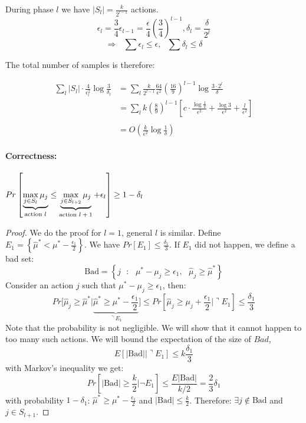 During phase $l$ we have $\left|S_{l}\right|=\frac{k}{2^{l-1}}$
actions.
\[
\epsilon_{l}=\frac{3}{4}\epsilon_{l-1}=\frac{\epsilon}{4}\left(\frac{3}{4}\right)^{l-1},\text{
}\delta_{l}=\frac{\delta}{2^{l}}
\]
\[
\Rightarrow\text{ }{\displaystyle \sum\epsilon_{l}\le\epsilon},\text{ }{\displaystyle \sum\delta_{l}\le\delta}
\]

The total number of samples is therefore:

\begin{align*}
 \sum_l |S_l| \cdot \frac{4}{\epsilon_l^2}\log \frac{3}{\delta_l} &=
\sum_{l}\frac{k}{2^{l-1}}\frac{64}{\epsilon^{2}}\left(\frac{16}{9}\right)^{l-1}\log\frac{3\cdot2^{l}}{\delta}\\
& =  {\displaystyle \sum_{l}k\left(\frac{8}{9}\right)^{l-1}\left[c\cdot\frac{\log\frac{1}{\delta}}{\epsilon^{2}}+\frac{\log3}{\epsilon^{2}}+\frac{l}{\epsilon^{2}}\right]}\\
\\
 & =  O\left(\frac{k}{\epsilon^{2}}\log\frac{1}{\delta}\right)
\end{align*}


\paragraph{Correctness:}

\begin{theorem}
$Pr\left[\underbrace{{\displaystyle \max_{j\in
S_{l}}\mu_{j}}}_{\text{action
\ensuremath{l}}}\le\underbrace{{\displaystyle \max_{j\in
S_{l+2}}\mu_{j}}}_{\text{action
\ensuremath{l+1}}}+\epsilon_{l}\right]\ge1-\delta_{l}$
\end{theorem}

\begin{proof}
We do the proof for $l=1$, general $l$ is similar. Define
$E_{1}=\left\{\hat{\mu}^{*}<\mu^{*}-\frac{\epsilon_{1}}{2}\right\}$.
We have  $Pr\left[E_{1}\right]\le\frac{\delta_{1}}{3}$. If $E_{1}$
did not happen, we define a bad set:
\[
\text{Bad}=\left\{ j\text{ }:\text{ }\mu^{*}-\mu_{j}\ge\epsilon_{1},\text{ }\hat{\mu}_{j}\ge\hat{\mu}^{*}\right\}
\]
Consider an action $j$ such that $\mu^*-\mu_j\geq \epsilon_1$, then:
\[
Pr[\hat{\mu}_{j}\geq
\hat{\mu}^{*}|\underbrace{\hat{\mu}^{*}\ge\mu^{*}-\frac{\epsilon_{1}}{2}}_{\urcorner
E_{1}}\big] \le
Pr[\hat{\mu}_{j}\ge\mu_{j}+\frac{\epsilon_{1}}{2}|\urcorner E_{1}]
\le  \frac{\delta_{1}}{3}
\]
Note that the probability is not negligible. We will show that it
cannot happen to too many such actions. We will bound the
expectation of the size of $Bad$,
\[
E[|\text{Bad}||\urcorner E_{1}]\le k\frac{\delta_{1}}{3}
\]
 with Markov's inequality we get:
\[
Pr\left[\left|\text{Bad}\right|\ge\frac{k}{2}\big|\neg E_{1}\right]
 \le  \frac{E\left|\text{Bad}\right|}{k/2}
  =  \frac{2}{3}\delta_{1}
\]
 with probability $1-\delta_{1}$: $\hat{\mu}^{*}\ge\mu^{*}-\frac{\epsilon_{1}}{2}$
and $\left|\text{Bad}\right|\le\frac{k}{2}$.
 Therefore: $\exists {j}\notin\text{Bad}$ and $j\in S_{l+1}$.
\end{proof}
